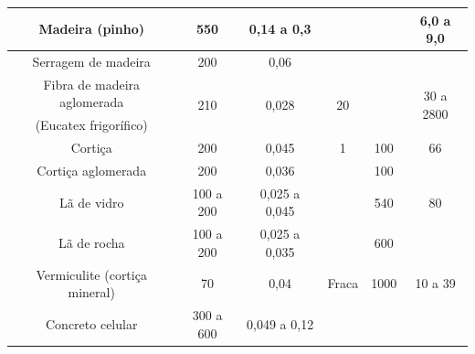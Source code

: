 \documentclass[c]{beamer}
\begin{document}
{\begin{frame}
\begin{table}[c]
\begin{center}
{\begin{tabular}{c|c|c|c|c|c}
						Madeira (pinho)                                          &550                                 &0,14 a 0,3                                       &                                    &                                        &6,0 a 9,0\\ \hline
						Serragem de madeira                                      &200                                 &0,06                                             &                                    &                                        &\\ \hline
						Fibra de madeira aglomerada                              &\multirow{2}{*}{210}                &\multirow{2}{*}{0,028}                           &\multirow{2}{*}{20}                 &                                        &\multirow{2}{*}{30 a 2800}\\
						(Eucatex frigorífico)                                    &                                    &                                                 &                                    &                                        &\\ \hline 
						Cortiça                                                  &200                                 &0,045                                            &1                                   &100                                        &66\\ \hline
						Cortiça aglomerada                                       &200                                 &0,036                                            &                                    &100                                     &\\ \hline
						Lã de vidro                                              &100 a 200                           &0,025 a 0,045                                    &                                    &540                                     &80\\ \hline
						Lã de rocha                                              &100 a 200                           &0,025 a 0,035                                    &                                    &600                                     &\\ \hline
						Vermiculite (cortiça mineral)                            &70                                  &0,04                                             &Fraca                               &1000                                    &10 a 39\\ \hline
						Concreto celular                                         &300 a 600                           &0,049 a 0,12                                     &                                    &                                        &\\ \hline

\end{tabular}}
\end{center}
\end{table}
\end{frame}}
\end{document}
